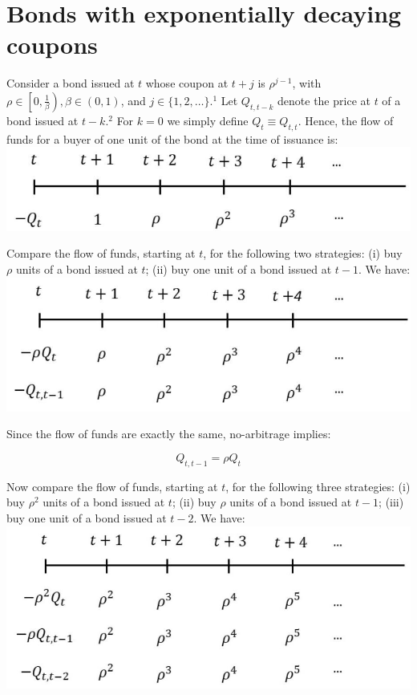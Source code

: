 \documentclass[10pt]{article}
\begin{document}
\section*{Bonds with exponentially decaying coupons}
Consider a bond issued at $t$ whose coupon at $t+j$ is $\rho^{j-1}$, with $\rho \in\left[0, \frac{1}{\beta}\right), \beta \in(0,1)$, and $j \in\{1,2, \ldots\} .^{1}$ Let $Q_{t, t-k}$ denote the price at $t$ of a bond issued at $t-k .{ }^{2}$ For $k=0$ we simply define $Q_{t} \equiv Q_{t, t}$. Hence, the flow of funds for a buyer of one unit of the bond at the time of issuance is:\\
\includegraphics[max width=\textwidth, center]{2024_12_20_d3f1b1434ca90032aac2g-1(1)}

Compare the flow of funds, starting at $t$, for the following two strategies: (i) buy $\rho$ units of a bond issued at $t$; (ii) buy one unit of a bond issued at $t-1$. We have:\\
\includegraphics[max width=\textwidth, center]{2024_12_20_d3f1b1434ca90032aac2g-1(2)}

Since the flow of funds are exactly the same, no-arbitrage implies:

\begin{equation*}
Q_{t, t-1}=\rho Q_{t}
\end{equation*}

Now compare the flow of funds, starting at $t$, for the following three strategies: (i) buy $\rho^{2}$ units of a bond issued at $t$; (ii) buy $\rho$ units of a bond issued at $t-1$; (iii) buy one unit of a bond issued at $t-2$. We have:\\
\includegraphics[max width=\textwidth, center]{2024_12_20_d3f1b1434ca90032aac2g-1}
\end{document}
